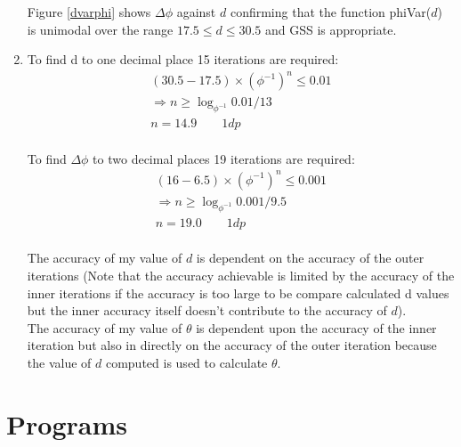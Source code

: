 \documentclass[a4paper]{article}
\begin{document}
\begin{enumerate}
    Figure \ref{dvarphi} shows $\Delta\phi$ against $d$ confirming that the function phiVar($d$) is unimodal over the range $17.5\leq d\leq 30.5$ and GSS is appropriate.
\item
	To find d to one decimal place 15 iterations are required:
    \begin{gather*}
    (30.5-17.5)\times(\phi^{-1})^n \leq 0.01 \\
    \Rightarrow n \geq \log_{\phi^{-1}}{0.01/13} \\
    n = 14.9 \qquad 1 dp 
    \end{gather*}
	\\
    To find $\Delta\phi$ to two decimal places 19 iterations are required:
    \begin{gather*}
    (16-6.5)\times(\phi^{-1})^n \leq 0.001 \\
    \Rightarrow n \geq \log_{\phi^{-1}}{0.001/9.5} \\
    n = 19.0 \qquad 1 dp 
    \end{gather*}
    \\
    The accuracy of my value of $d$ is dependent on the accuracy of the outer iterations (Note that the accuracy achievable is limited by the accuracy of the inner iterations if the accuracy is too large to be compare calculated d values but the inner accuracy itself doesn't contribute to the accuracy of $d$).
    \\
    The accuracy of my value of $\theta$ is dependent upon the accuracy of the inner iteration but also in directly on the accuracy of the outer iteration because the value of $d$ computed is used to calculate $\theta$.
\end{enumerate}

\pagebreak
\section*{Programs}
\end{document}

